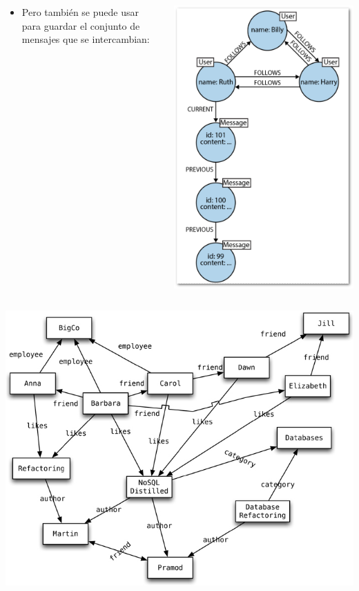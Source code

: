 \documentclass[14pt]{beamer}
\begin{document}
\begin{frame}[allowframebreaks]
\begin{columns}
\begin{column}{.5\textwidth}
\begin{itemize}
      \item Pero también se puede usar para guardar el conjunto de mensajes
        que se intercambian:
      \end{itemize}
    \end{column}
      \begin{column}{.5\textwidth}
        \begin{center}
          \includegraphics[width=.8\textwidth]{img/graph2}
        \end{center}
      \end{column}
    \end{columns}

  \begin{center}
\includegraphics[width=.86\textwidth]{img/graph}
  \end{center}
\end{frame}
\end{document}
